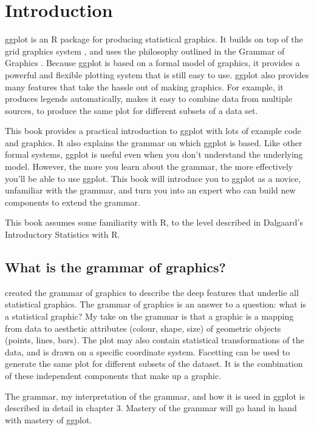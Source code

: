 

\chapter{Introduction}

ggplot is an R package for producing statistical graphics.  It builds on top of the grid graphics system \citep{grid}, and uses the philosophy outlined in the Grammar of Graphics \citep{wilkinson:2006}.  Because ggplot is based on a formal model of graphics, it provides a powerful and flexible plotting system that is still easy to use.  ggplot also provides many features that take the hassle out of making graphics. For example, it produces legends automatically, makes it easy to combine data from multiple sources, to produce the same plot for different subsets of a data set.

This book provides a practical introduction to ggplot with lots of example code and graphics. It also explains the grammar on which ggplot is based. Like other formal systems, ggplot is useful even when you don't understand the underlying model. However, the more you learn about the grammar, the more effectively you'll be able to use ggplot. This book will introduce you to ggplot as a novice, unfamiliar with the grammar, and turn you into an expert who can build new components to extend the grammar.

This book assumes some familiarity with R, to the level described in Dalgaard’s Introductory Statistics with R.

\section{What is the grammar of graphics?}

\citet{wilkinson:2006} created the grammar of graphics to describe the deep features that underlie all statistical graphics.  The grammar of graphics is an answer to a question: what is a statistical graphic?  My take on the grammar is that a graphic is a mapping from data to  aesthetic attributes (colour, shape, size) of geometric objects (points, lines, bars).  The plot may also contain statistical transformations of the data, and is drawn on a specific  coordinate system.  Facetting can be used to generate the same plot for different subsets of the dataset.  It is the combination of these independent components that make up a graphic.  

The grammar, my interpretation of the grammar, and how it is used in ggplot is described in detail in chapter 3.  Mastery of the grammar will go hand in hand with mastery of ggplot.

